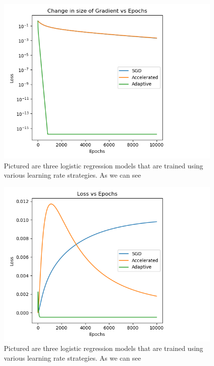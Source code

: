 \documentclass{article}
\begin{document}
\begin{figure}[h]{
    \centering
    \includegraphics[width=.8\textwidth]{gradient_size.png}
    \caption{Pictured are three logistic regression models that are trained using various learning rate strategies. As we can see}
    \label{fig:my_label}
    }
\end{figure}


\begin{figure}[h]{
    \centering
    \includegraphics[width=.8\textwidth]{loss.png}
    \caption{Pictured are three logistic regression models that are trained using various learning rate strategies. As we can see}
    \label{fig:my_label}
    }
\end{figure}
\end{document}
